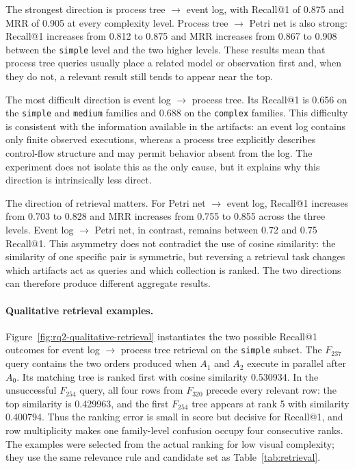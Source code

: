 \documentclass[mathematics,article,submit,moreauthors]{Definitions/mdpi}
\begin{document}
The strongest direction is process tree $\rightarrow$ event log, with Recall@1 of 0.875 and MRR of 0.905 at every complexity level. Process tree $\rightarrow$ Petri net is also strong: Recall@1 increases from 0.812 to 0.875 and MRR increases from 0.867 to 0.908 between the \texttt{simple} level and the two higher levels. These results mean that process tree queries usually place a related model or observation first and, when they do not, a relevant result still tends to appear near the top.

The most difficult direction is event log $\rightarrow$ process tree. Its Recall@1 is 0.656 on the \texttt{simple} and \texttt{medium} families and 0.688 on the \texttt{complex} families. This difficulty is consistent with the information available in the artifacts: an event log contains only finite observed executions, whereas a process tree explicitly describes control-flow structure and may permit behavior absent from the log. The experiment does not isolate this as the only cause, but it explains why this direction is intrinsically less direct.

The direction of retrieval matters. For Petri net $\rightarrow$ event log, Recall@1 increases from 0.703 to 0.828 and MRR increases from 0.755 to 0.855 across the three levels. Event log $\rightarrow$ Petri net, in contrast, remains between 0.72 and 0.75 Recall@1. This asymmetry does not contradict the use of cosine similarity: the similarity of one specific pair is symmetric, but reversing a retrieval task changes which artifacts act as queries and which collection is ranked. The two directions can therefore produce different aggregate results.

\paragraph{Qualitative retrieval examples.}
Figure~\ref{fig:rq2-qualitative-retrieval} instantiates the two possible Recall@1 outcomes for event log $\rightarrow$ process tree retrieval on the \texttt{simple} subset. The \(F_{237}\) query contains the two orders produced when \(A_1\) and \(A_2\) execute in parallel after \(A_0\). Its matching tree is ranked first with cosine similarity 0.530934. In the unsuccessful \(F_{254}\) query, all four rows from \(F_{320}\) precede every relevant row: the top similarity is 0.429963, and the first \(F_{254}\) tree appears at rank 5 with similarity 0.400794. Thus the ranking error is small in score but decisive for Recall@1, and row multiplicity makes one family-level confusion occupy four consecutive ranks. The examples were selected from the actual ranking for low visual complexity; they use the same relevance rule and candidate set as Table~\ref{tab:retrieval}.
\end{document}
